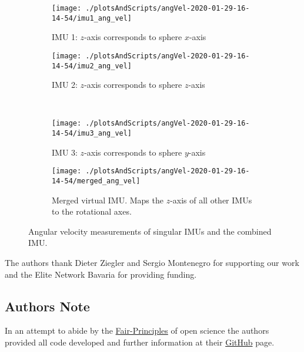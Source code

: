\documentclass[graybox]{svmult}
\newcommand{\1}{\mathbbm{1}}                 %
\begin{document}
\begin{figure}
\centering
\begin{subfigure}{0.45\textwidth}
\texttt{[image: ./plotsAndScripts/angVel-2020-01-29-16-14-54/imu1\_ang\_vel]}
\caption{IMU 1: $z$-axis corresponds to sphere $x$-axis}
\label{sec:technicalApproach:fig:imu1_ang_vel}
\end{subfigure}\hfill
\begin{subfigure}{0.45\textwidth}
\texttt{[image: ./plotsAndScripts/angVel-2020-01-29-16-14-54/imu2\_ang\_vel]}
\caption{IMU 2: $z$-axis corresponds to sphere $z$-axis}
\label{sec:technicalApproach:fig:imu2_ang_vel}
\end{subfigure}\hfill\\

\begin{subfigure}{0.45\textwidth}
\texttt{[image: ./plotsAndScripts/angVel-2020-01-29-16-14-54/imu3\_ang\_vel]}
\caption{IMU 3: $z$-axis corresponds to sphere $y$-axis}
\label{sec:technicalApproach:fig:imu3_ang_vel}
\end{subfigure}\hfill
\begin{subfigure}{0.45\textwidth}
\texttt{[image: ./plotsAndScripts/angVel-2020-01-29-16-14-54/merged\_ang\_vel]}
\caption{Merged virtual IMU. Maps the $z$-axis of all other IMUs to the rotational axes.}
\label{sec:technicalApproach:fig:merged_ang_vel}
\end{subfigure}\hfill
\caption{Angular velocity measurements of singular IMUs and the combined IMU.}
\label{sec:technicalApproach:fig:angvel}
\end{figure}

\begin{acknowledgement}
The authors thank Dieter Ziegler and Sergio Montenegro for supporting our work and the Elite Network Bavaria for providing funding. 

\subsection*{Authors Note}
In an attempt to abide by the \href{https://www.go-fair.org/fair-principles}{Fair-Principles} of open science the authors provided all code developed and further information at their \href{https://github.com/fallow24/L.U.N.A}{GitHub} page.
\end{acknowledgement}



\end{document}
